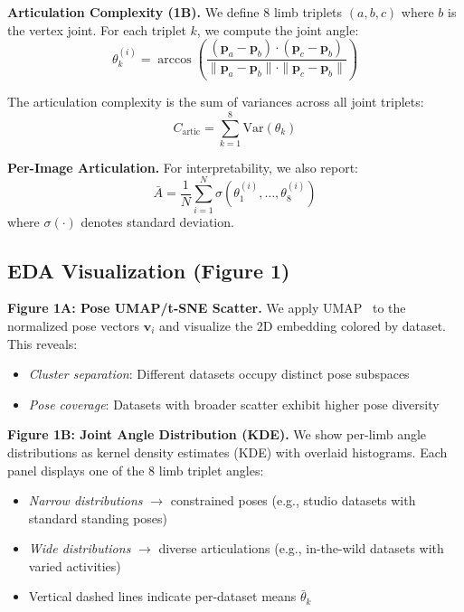 \documentclass[runningheads]{llncs}
\newcommand{\Var}{\mathrm{Var}}
\newcommand{\bvec}[1]{\bm{#1}}
\begin{document}
\textbf{Articulation Complexity (1B).} We define 8 limb triplets $(a, b, c)$ where $b$ is the vertex joint. For each triplet $k$, we compute the joint angle:
\begin{equation}
    \theta_k^{(i)} = \arccos\left(\frac{(\bvec{p}_a - \bvec{p}_b) \cdot (\bvec{p}_c - \bvec{p}_b)}{\|\bvec{p}_a - \bvec{p}_b\| \cdot \|\bvec{p}_c - \bvec{p}_b\|}\right)
\end{equation}

The articulation complexity is the sum of variances across all joint triplets:
\begin{equation}
    C_{\text{artic}} = \sum_{k=1}^{8} \Var(\theta_k)
\end{equation}

\textbf{Per-Image Articulation.} For interpretability, we also report:
\begin{equation}
    \bar{A} = \frac{1}{N}\sum_{i=1}^{N} \sigma(\theta_1^{(i)}, \ldots, \theta_8^{(i)})
\end{equation}
where $\sigma(\cdot)$ denotes standard deviation.

\subsection{EDA Visualization (Figure 1)}

\textbf{Figure 1A: Pose UMAP/t-SNE Scatter.} We apply UMAP~\cite{mcinnes2018umap} to the normalized pose vectors $\bvec{v}_i$ and visualize the 2D embedding colored by dataset. This reveals:
\begin{itemize}
    \item \textit{Cluster separation}: Different datasets occupy distinct pose subspaces
    \item \textit{Pose coverage}: Datasets with broader scatter exhibit higher pose diversity
\end{itemize}

\textbf{Figure 1B: Joint Angle Distribution (KDE).} We show per-limb angle distributions as kernel density estimates (KDE) with overlaid histograms. Each panel displays one of the 8 limb triplet angles:
\begin{itemize}
    \item \textit{Narrow distributions} $\rightarrow$ constrained poses (e.g., studio datasets with standard standing poses)
    \item \textit{Wide distributions} $\rightarrow$ diverse articulations (e.g., in-the-wild datasets with varied activities)
    \item Vertical dashed lines indicate per-dataset means $\bar{\theta}_k$
\end{itemize}
\end{document}
